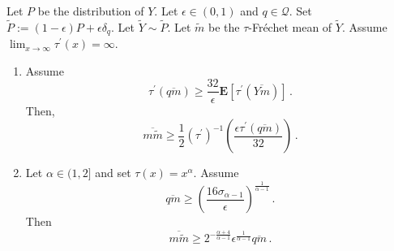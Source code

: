 \documentclass{article}
\newcommand*{\mc}[1]{\mathcal{#1}}
\newcommand{\lab}{\left[} %
\newcommand{\rab}{\right]} %
\newcommand{\ab}[1]{\lab #1 \rab} %
\newcommand{\abOf}[1]{\!\ab{#1}} %
\newcommand{\lb}{\left(} %
\newcommand{\rb}{\right)} %
\newcommand{\br}[1]{\lb #1 \rb} %
\newcommand{\brOf}[1]{\!\br{#1}} %
\newcommand{\E}{\mathbf{E}} %
\newcommand{\EOf}[1]{\E\abOf{#1}}
\newcommand{\pr}{^\prime}
\newcommand{\eqfs}{\,.}
\newcommand{\ol}[2]{\overline{#1#2}}
\newcommand{\tran}{\tau}
\newcommand{\dtran}{\tau\pr}
\newcommand{\invdtran}{(\tau\pr)^{-1}}
\begin{document}
\begin{lemma}\label{lmm:general:lower}
    Let $P$ be the distribution of $Y$.
    Let $\epsilon\in(0,1)$ and $q\in\mc Q$.
    Set $\tilde P := (1-\epsilon)P + \epsilon \delta_q$. 
    Let $\tilde Y \sim \tilde P$. 
    Let $\tilde m$ be the $\tran$-Fr\'echet mean of $\tilde Y$.
    Assume $\lim_{x\to\infty} \dtran(x) = \infty$.
    \begin{enumerate}[label=(\roman*)]
        \item
        Assume 
        \begin{equation}
            \dtran(\ol qm) \geq \frac{32}{\epsilon} \EOf{\dtran(\ol {Y}m)}
            \eqfs
        \end{equation}
        Then,
        \begin{equation}
            \ol m{\tilde m} 
            \geq
            \frac12 \invdtran\brOf{\frac{\epsilon \dtran(\ol qm)}{32}}
            \eqfs
        \end{equation}
        \item 
        Let $\alpha \in (1, 2]$ and set $\tran(x) = x^\alpha$.
        Assume 
        \begin{equation}
            \ol qm\geq \br{\frac{16 \sigma_{\alpha-1}}{\epsilon}} ^{\frac{1}{\alpha-1}}
            \eqfs
        \end{equation}
        Then
        \begin{equation}
            \ol m{\tilde m}
            \geq 2^{-\frac{\alpha+4}{\alpha-1}}
            \epsilon^{\frac{1}{\alpha-1}} \ol qm
            \eqfs
        \end{equation}
    \end{enumerate} 
\end{lemma}
%
\end{document}
